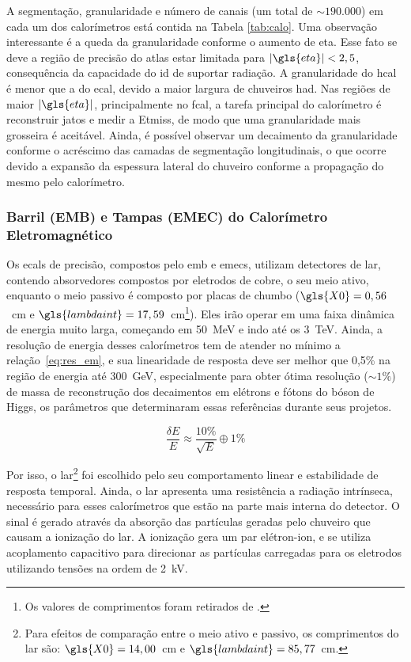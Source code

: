A segmentação, granularidade e número de canais (um total de $\sim190.000$) 
em cada um dos calorímetros está contida
na Tabela \ref{tab:calo}. Uma observação interessante é a queda da granularidade
conforme o aumento de \gls{eta}. Esse fato se deve a região de precisão do 
\gls{atlas} estar limitada para $|\gls{eta}| < 2,5$, consequência da capacidade do
\gls{id} de suportar radiação. A granularidade do
\gls{hcal} é menor que a do \gls{ecal}, devido a maior largura de chuveiros
\gls{had}. Nas regiões de maior $|\gls{eta}|$, principalmente no \gls{fcal}, 
a tarefa principal do calorímetro é reconstruir jatos e medir a
\gls{Etmiss}, de modo que uma granularidade mais grosseira é aceitável.
Ainda, é possível observar um decaimento da granularidade conforme o acréscimo
das camadas de segmentação longitudinais, o que ocorre devido a expansão da
espessura lateral do chuveiro conforme a propagação do mesmo pelo calorímetro.


\subsubsection{Barril (EMB) e Tampas (EMEC) do Calorímetro Eletromagnético}
\label{par:ecal_prec}

Os \glspl{ecal} de precisão, compostos pelo \gls{emb} e \glspl{emec}, 
utilizam detectores de \gls{lar}, contendo absorvedores compostos por eletrodos 
de cobre, o seu meio ativo, enquanto o meio passivo é composto por placas de
chumbo ($\gls{X0}=0,56$~cm e $\gls{lambdaint}=17,59$~cm\footnote{Os valores de
comprimentos foram retirados de \cite{pdg_comp}.\label{fn:comp_rad_nucl}}). Eles
irão operar em uma faixa dinâmica de energia muito larga, começando em 50~MeV
e indo até os 3~TeV. Ainda, a resolução de energia desses calorímetros tem de
atender no mínimo a relação~\ref{eq:res_em}, e sua linearidade de resposta deve ser melhor 
que 0,5\% na região de energia até 300~GeV, especialmente para obter ótima 
resolução ($\sim1\%$) de massa de reconstrução dos decaimentos em elétrons e fótons 
do bóson de Higgs, os parâmetros que determinaram essas referências durante
seus projetos. 

\begin{equation}\label{eq:res_em}
\frac{\delta E}{E} \approx \frac{10\%}{\sqrt{E}} \oplus 1\%
\end{equation}

Por isso, o \gls{lar}\footnote{Para efeitos de comparação entre o meio ativo e passivo, 
os comprimentos do \gls{lar} são: $\gls{X0}=14,00$~cm e $\gls{lambdaint}=85,77$~cm.} 
foi escolhido pelo seu comportamento linear e estabilidade de resposta temporal. 
Ainda, o \gls{lar} apresenta uma resistência a radiação intrínseca, necessário
para esses calorímetros que estão na parte mais interna do detector. O sinal é gerado
através da absorção das partículas geradas pelo chuveiro que causam a ionização
do \gls{lar}. A ionização gera um par elétron-ion, e se utiliza acoplamento
capacitivo para direcionar as partículas carregadas para os eletrodos
utilizando tensões na ordem de 2~kV.

